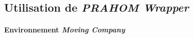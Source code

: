 \documentclass[demonstration]{jfsma}
\newcommand{\probP}{\text{I\kern-0.15em P}}
\begin{document}







\subsection{Utilisation de \emph{PRAHOM Wrapper}}

\paragraph{Environnement \emph{Moving Company}}
\end{document}
